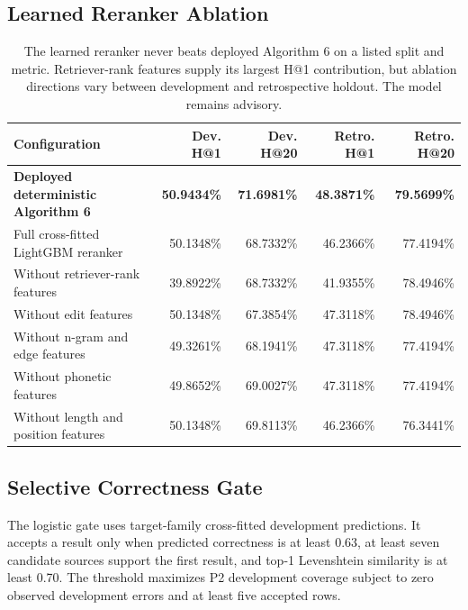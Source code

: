 \documentclass[11pt,a4paper]{article}
\begin{document}
\subsection{Learned Reranker Ablation}

\begin{table}[htbp]
\centering
\small
\begin{tabularx}{\linewidth}{@{}Yrrrr@{}}
\toprule
\textbf{Configuration} & \textbf{Dev. H@1} & \textbf{Dev. H@20} &
\textbf{Retro. H@1} & \textbf{Retro. H@20} \\
\midrule
\textbf{Deployed deterministic Algorithm 6} & \textbf{50.9434\%} & \textbf{71.6981\%} & \textbf{48.3871\%} & \textbf{79.5699\%} \\
Full cross-fitted LightGBM reranker & 50.1348\% & 68.7332\% & 46.2366\% & 77.4194\% \\
Without retriever-rank features & 39.8922\% & 68.7332\% & 41.9355\% & 78.4946\% \\
Without edit features & 50.1348\% & 67.3854\% & 47.3118\% & 78.4946\% \\
Without n-gram and edge features & 49.3261\% & 68.1941\% & 47.3118\% & 77.4194\% \\
Without phonetic features & 49.8652\% & 69.0027\% & 47.3118\% & 77.4194\% \\
Without length and position features & 50.1348\% & 69.8113\% & 46.2366\% & 76.3441\% \\
\bottomrule
\end{tabularx}
\caption{The learned reranker never beats deployed Algorithm 6 on a listed
split and metric. Retriever-rank features supply its largest H@1 contribution,
but ablation directions vary between development and retrospective holdout.
The model remains advisory.}
\label{tab:a6-ranker-ablation}
\end{table}

\subsection{Selective Correctness Gate}

The logistic gate uses target-family cross-fitted development predictions. It
accepts a result only when predicted correctness is at least 0.63, at least
seven candidate sources support the first result, and top-1 Levenshtein
similarity is at least 0.70. The threshold maximizes P2 development coverage
subject to zero observed development errors and at least five accepted rows.
\end{document}
